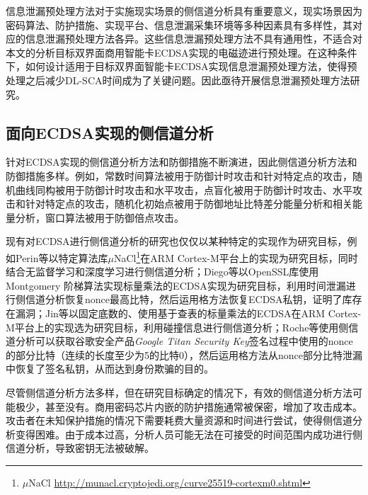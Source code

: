{	信息泄漏预处理方法对于实施现实场景的侧信道分析具有重要意义，现实场景因为密码算法、防护措施、实现平台、信息泄漏采集环境等多种因素具有多样性，其对应的信息泄漏预处理方法各异。这些信息泄漏预处理方法不具有通用性，不适合对本文的分析目标双界面商用智能卡ECDSA实现的电磁迹进行预处理。在这种条件下，如何设计适用于目标双界面智能卡ECDSA实现信息泄漏预处理方法，使得预处理之后减少DL-SCA时间成为了关键问题。因此亟待开展信息泄漏预处理方法研究。
	
	\subsection{面向ECDSA实现的侧信道分析}
	针对ECDSA实现的侧信道分析方法和防御措施不断演进，因此侧信道分析方法和防御措施多样。例如，常数时间算法被用于防御计时攻击\citep{Kocher96}和针对特定点的攻击\citep{Sato04}，随机曲线同构\citep{Joye01}被用于防御计时攻击\citep{Kocher96}和水平攻击\citep{Clavier10}，点盲化\citep{Coron99}被用于防御计时攻击\citep{Kocher96}、水平攻击\citep{Clavier10}和针对特定点的攻击\citep{Sato04}，随机化初始点\citep{Mamiya04,Abidalrahman10,Tawalbeh16}被用于防御地址比特差分能量分析\citep{Itoh02}和相关能量分析\citep{Coron99}，窗口算法\citep{Reddy11}被用于防御倍点攻击\citep{Fouque03}。
	
	现有对ECDSA进行侧信道分析的研究也仅仅以某种特定的实现作为研究目标，例如Perin等\citep{Perin20}以特定算法库$\mu$NaCl\footnote{$\mu$NaCl \href{http://munacl.cryptojedi.org/curve25519-cortexm0.shtml}{http://munacl.cryptojedi.org/curve25519-cortexm0.shtml}}在ARM Cortex-M平台上的实现为研究目标，同时结合无监督学习和深度学习进行侧信道分析；Diego等\citep{Diego20}以OpenSSL库使用Montgomery 阶梯算法\citep{Cohen05,Blake05}实现标量乘法的ECDSA实现为研究目标，利用时间泄漏进行侧信道分析恢复nonce最高比特，然后运用格方法恢复ECDSA私钥，证明了库存在漏洞；Jin等\citep{Jin21}以固定底数的、使用基于查表的标量乘法的ECDSA在ARM Cortex-M平台上的实现选为研究目标，利用碰撞信息进行侧信道分析；Roche等\citep{Roche21}使用侧信道分析可以获取谷歌安全产品\textit{Google Titan Security Key}\citep{Titan}签名过程中使用的nonce的部分比特（连续的长度至少为5的比特0），然后运用格方法从nonce部分比特泄漏中恢复了签名私钥，从而达到身份欺骗的目的。
	
	尽管侧信道分析方法多样，但在研究目标确定的情况下，有效的侧信道分析方法可能极少，甚至没有。商用密码芯片内嵌的防护措施通常被保密，增加了攻击成本。攻击者在未知保护措施的情况下需要耗费大量资源和时间进行尝试，使得侧信道分析变得困难。由于成本过高，分析人员可能无法在可接受的时间范围内成功进行侧信道分析，导致密钥无法被破解。
	
}

